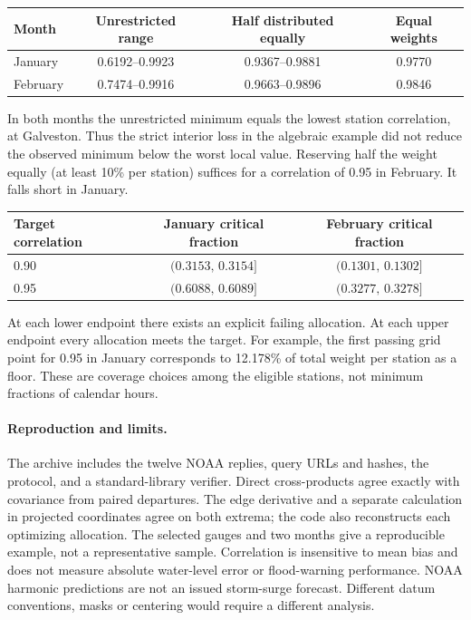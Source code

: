 \documentclass[11pt]{article}
\begin{document}
\begin{center}
\begin{tabular}{lccc}
\toprule
Month & Unrestricted range & Half distributed equally & Equal weights\\
\midrule
January & 0.6192--0.9923 & 0.9367--0.9881 & 0.9770\\
February & 0.7474--0.9916 & 0.9663--0.9896 & 0.9846\\
\bottomrule
\end{tabular}
\end{center}
In both months the unrestricted minimum equals the lowest station correlation, at Galveston. Thus the strict interior loss in the algebraic example did not reduce the observed minimum below the worst local value. Reserving half the weight equally (at least 10\% per station) suffices for a correlation of 0.95 in February. It falls short in January.

\begin{center}
\begin{tabular}{lcc}
\toprule
Target correlation & January critical fraction & February critical fraction\\
\midrule
0.90 & $(0.3153,\,0.3154]$ & $(0.1301,\,0.1302]$\\
0.95 & $(0.6088,\,0.6089]$ & $(0.3277,\,0.3278]$\\
\bottomrule
\end{tabular}
\end{center}
At each lower endpoint there exists an explicit failing allocation. At each upper endpoint every allocation meets the target. For example, the first passing grid point for 0.95 in January corresponds to 12.178\% of total weight per station as a floor. These are coverage choices among the eligible stations, not minimum fractions of calendar hours.

\paragraph{Reproduction and limits.} The archive includes the twelve NOAA replies, query URLs and hashes, the protocol, and a standard-library verifier. Direct cross-products agree exactly with covariance from paired departures. The edge derivative and a separate calculation in projected coordinates agree on both extrema; the code also reconstructs each optimizing allocation. The selected gauges and two months give a reproducible example, not a representative sample. Correlation is insensitive to mean bias and does not measure absolute water-level error or flood-warning performance. NOAA harmonic predictions are not an issued storm-surge forecast. Different datum conventions, masks or centering would require a different analysis.
\end{document}
